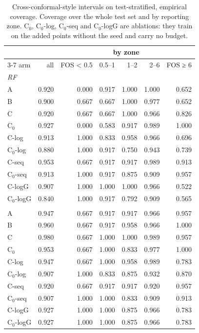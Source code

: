 \begin{table}[htbp]
\centering
\caption{Cross-conformal-style intervals on test-stratified, empirical coverage. Coverage over the whole test set and by reporting zone. C$_0$, C$_0$-log, C$_0$-seq and C$_0$-logG are ablations: they train on the added points without the seed and carry no budget.}
\label{tab:test-stratified__log-rmse:conformal}
\begin{tabular}{lrrrrrr}
\toprule
 &  & \multicolumn{5}{c}{by zone} \\
\cmidrule(lr){3-7}
arm & all & FOS < 0.5 & 0.5–1 & 1–2 & 2–6 & FOS ≥ 6 \\
\midrule
\multicolumn{7}{l}{\textit{RF}} \\
A & 0.920 & 0.000 & 0.917 & 1.000 & 1.000 & 0.652 \\
B & 0.900 & 0.667 & 0.667 & 1.000 & 0.977 & 0.652 \\
C & 0.920 & 0.667 & 0.667 & 1.000 & 0.966 & 0.826 \\
C$_0$ & 0.927 & 0.000 & 0.583 & 0.917 & 0.989 & 1.000 \\
C-log & 0.913 & 1.000 & 0.833 & 0.958 & 0.966 & 0.696 \\
C$_0$-log & 0.880 & 1.000 & 0.917 & 0.750 & 0.943 & 0.739 \\
C-seq & 0.953 & 0.667 & 0.917 & 0.917 & 0.989 & 0.913 \\
C$_0$-seq & 0.913 & 1.000 & 0.917 & 0.875 & 0.909 & 0.957 \\
C-logG & 0.907 & 1.000 & 1.000 & 1.000 & 0.966 & 0.522 \\
C$_0$-logG & 0.840 & 1.000 & 0.917 & 0.792 & 0.909 & 0.565 \\
\addlinespace
\multicolumn{7}{l}{\textit{GBM}} \\
A & 0.947 & 0.667 & 0.917 & 0.917 & 0.966 & 0.957 \\
B & 0.960 & 0.667 & 0.917 & 0.958 & 0.966 & 1.000 \\
C & 0.980 & 0.667 & 1.000 & 1.000 & 0.989 & 0.957 \\
C$_0$ & 0.953 & 0.667 & 1.000 & 0.833 & 0.977 & 1.000 \\
C-log & 0.947 & 0.667 & 1.000 & 0.958 & 0.989 & 0.783 \\
C$_0$-log & 0.907 & 1.000 & 0.833 & 0.875 & 0.932 & 0.870 \\
C-seq & 0.920 & 0.667 & 0.917 & 0.917 & 0.920 & 0.957 \\
C$_0$-seq & 0.907 & 1.000 & 1.000 & 0.833 & 0.909 & 0.913 \\
C-logG & 0.927 & 1.000 & 1.000 & 0.875 & 0.966 & 0.783 \\
C$_0$-logG & 0.927 & 1.000 & 1.000 & 0.875 & 0.966 & 0.783 \\
\bottomrule
\end{tabular}
\end{table}
